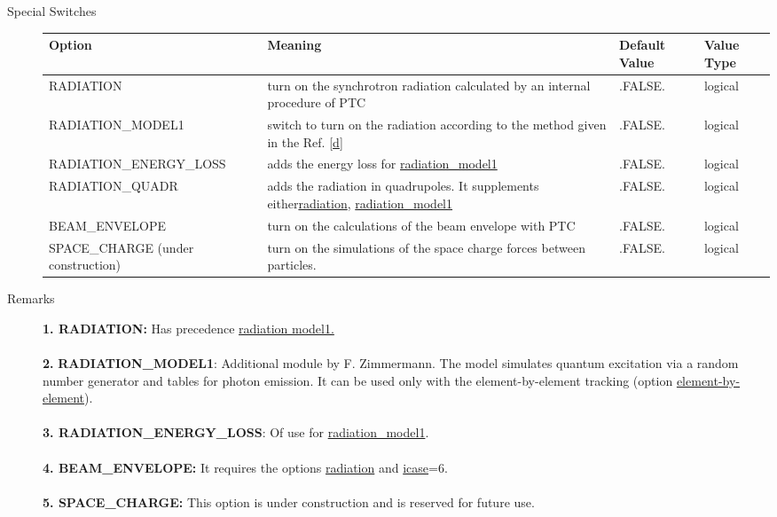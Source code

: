 \begin{description}
	\item[Special Switches] 
	\text{ \\}	
	
\begin{tabular}{l p{5cm} p{2cm} p{2cm}}
\hline 
\textbf{Option} & \textbf{Meaning} & \textbf{Default Value} & \textbf{Value Type} \\ 
\hline
RADIATION & turn on the synchrotron radiation calculated by an internal procedure of PTC & .FALSE. & logical \\ 
\hline
RADIATION\_MODEL1 & switch to turn on the radiation according to the method given in the Ref. [\hyperlink{G.J._Roy}{d}] & .FALSE. & logical \\ 
\hline
RADIATION\_ENERGY\_LOSS & adds the energy loss for \hyperlink{RADIATION_MODEL1}{radiation\_model1} & .FALSE. & logical \\ 
\hline
RADIATION\_QUADR & adds the radiation in quadrupoles. It supplements either\hyperlink{RADIATION}{radiation}, \hyperlink{RADIATION_MODEL1}{radiation\_model1} & .FALSE. & logical \\ 
\hline
BEAM\_ENVELOPE & turn on the calculations of the beam envelope with PTC  & .FALSE. & logical \\ 
\hline
SPACE\_CHARGE (under construction) & turn on the simulations of the space charge forces between particles.  & .FALSE. & logical \\ 
\hline
\end{tabular}

	\item[Remarks] \textbf{1. RADIATION: }Has precedence
       \hyperlink{RADIATION_MODEL1}{radiation model1.}
\\
\\\textbf{2. }\textbf{RADIATION\_MODEL1}: Additional 
       module by F. Zimmermann. The model simulates 
       quantum excitation via a random number generator and tables for 
     photon emission. It can be used only with the element-by-element 
     tracking (option \hyperlink{ELEMENT_BY_ELEMENT}{element-by-element}).
\\
\\\textbf{3. RADIATION\_ENERGY\_LOSS}: Of use for
       \hyperlink{RADIATION_MODEL1}{radiation\_model1}.
\\
\\\textbf{4. BEAM\_ENVELOPE:} It requires the options
       \hyperlink{RADIATION}{radiation} and \hyperlink{ICASE}{icase}=6.
\\
\\\textbf{5. SPACE\_CHARGE:} This option 
       is under construction and is reserved for future use.
\end{description}
